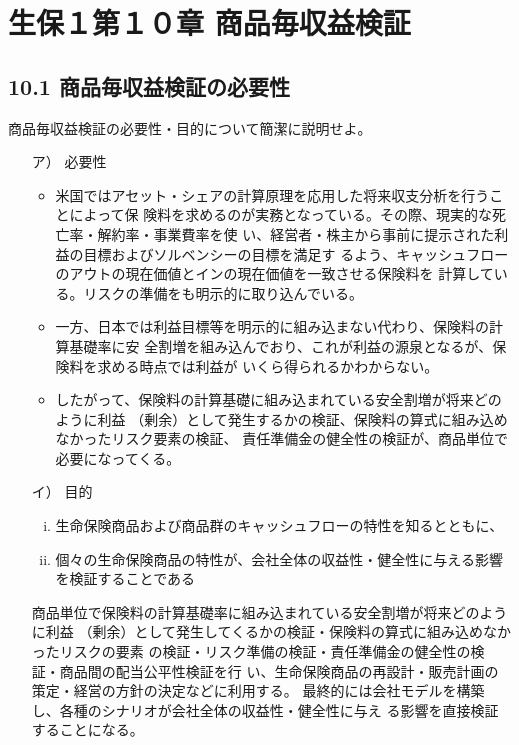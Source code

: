 \documentclass[report,gutter=10mm,fore-edge=10mm,uplatex,dvipdfmx]{jlreq}
\begin{document}
\chapter{生保１第１０章 商品毎収益検証}
\section{10.1 商品毎収益検証の必要性}
商品毎収益検証の必要性・目的について簡潔に説明せよ。

\begin{itemize}
 \item [ア）] 必要性
\begin{itemize}
 \item 
米国ではアセット・シェアの計算原理を応用した将来収支分析を行うことによって保
険料を求めるのが実務となっている。その際、現実的な死亡率・解約率・事業費率を使
い、経営者・株主から事前に提示された利益の目標およびソルベンシーの目標を満足す
るよう、キャッシュフローのアウトの現在価値とインの現在価値を一致させる保険料を
計算している。リスクの準備をも明示的に取り込んでいる。
 \item 
一方、日本では利益目標等を明示的に組み込まない代わり、保険料の計算基礎率に安
全割増を組み込んでおり、これが利益の源泉となるが、保険料を求める時点では利益が
いくら得られるかわからない。
 \item 
したがって、保険料の計算基礎に組み込まれている安全割増が将来どのように利益
（剰余）として発生するかの検証、保険料の算式に組み込めなかったリスク要素の検証、
責任準備金の健全性の検証が、商品単位で必要になってくる。
\end{itemize}

 \item [イ）] 目的

\begin{enumerate} [(i)]
 \item 生命保険商品および商品群のキャッシュフローの特性を知るとともに、
 \item 個々の生命保険商品の特性が、会社全体の収益性・健全性に与える影響を検証することである
\end{enumerate}

商品単位で保険料の計算基礎率に組み込まれている安全割増が将来どのように利益
（剰余）として発生してくるかの検証・保険料の算式に組み込めなかったリスクの要素
の検証・リスク準備の検証・責任準備金の健全性の検証・商品間の配当公平性検証を行
い、生命保険商品の再設計・販売計画の策定・経営の方針の決定などに利用する。
最終的には会社モデルを構築し、各種のシナリオが会社全体の収益性・健全性に与え
る影響を直接検証することになる。

\end{itemize}
\end{document}

